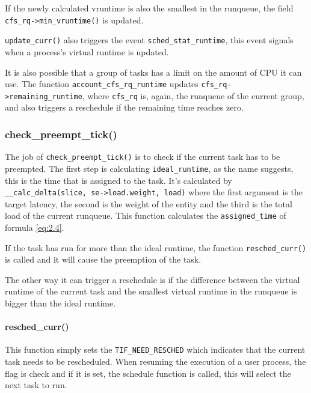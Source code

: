 If the newly calculated vruntime is also the smallest in the runqueue, the field \verb|cfs_rq->min_vruntime()| is updated.

\verb|update_curr()| also triggers the event \verb|sched_stat_runtime|\label{trace:sched_stat_runtime}, this event signals when a process's virtual runtime is updated.

It is also possible that a group of tasks has a limit on the amount of CPU it can use. The function \verb|account_cfs_rq_runtime| updates \newline \verb|cfs_rq->remaining_runtime|, where \verb|cfs_rq| is, again, the runqueue of the current group, and also triggers a reschedule if the remaining time reaches zero.

\subsubsection{check\_preempt\_tick()}

The job of \verb|check_preempt_tick()| is to check if the current task has to be preempted. The first step is calculating \verb|ideal_runtime|, as the name suggests, this is the time that is assigned to the task. It's calculated by \newline \verb|__calc_delta(slice, se->load.weight, load)| where the first argument is the target latency, the second is the weight of the entity and the third is the total load of the current runqueue. This function calculates the \verb|assigned_time| of formula \ref{eq:2.4}.

If the task has run for more than the ideal runtime, the function \verb|resched_curr()| is called and it will cause the preemption of the task.

The other way it can trigger a reschedule is if the difference between the virtual runtime of the current task and the smallest virtual runtime in the runqueue is bigger than the ideal runtime.

\paragraph{resched\_curr()}\label{resched_curr}
This function simply sets the \verb|TIF_NEED_RESCHED| which indicates that the current task needs to be rescheduled. When resuming the execution of a user process, the flag is check and if it is set, the schedule function is called, this will select the next task to run.

